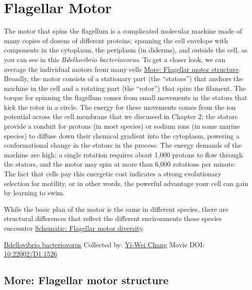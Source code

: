 \documentclass[]{tufte-book}
\begin{document}
\hypertarget{flagellar-motor}{%
\section{Flagellar Motor}\label{flagellar-motor}}

The motor that spins the flagellum is a complicated molecular machine made of many copies of dozens of different proteins, spanning the cell envelope with components in the cytoplasm, the periplasm (in diderms), and outside the cell, as you can see in this \emph{Bdellovibrio bacteriovorus}. To get a closer look, we can average the individual motors from many cells \protect\hyperlink{Flagellar_motor_structure}{More: Flagellar motor structure}. Broadly, the motor consists of a stationary part (the ``stators'') that anchors the machine in the cell and a rotating part (the ``rotor'') that spins the filament. The torque for spinning the flagellum comes from small movements in the stators that kick the rotor in a circle. The energy for these movements comes from the ion potential across the cell membrane that we discussed in Chapter 2; the stators provide a conduit for protons (in most species) or sodium ions (in some marine species) to diffuse down their chemical gradient into the cytoplasm, powering a conformational change in the stators in the process. The energy demands of the machine are high: a single rotation requires about 1,000 protons to flow through the stators, and the motor may spin at more than 6,000 rotations per minute. The fact that cells pay this energetic cost indicates a strong evolutionary selection for motility, or in other words, the powerful advantage your cell can gain by learning to swim.

While the basic plan of the motor is the same in different species, there are structural differences that reflect the different environments those species encounter \protect\hyperlink{Flagellar_motor_diversity}{Schematic: Flagellar motor diversity}.



\hypertarget{htmlwidget-c328341ea1ea4266c447}{}

\label{fig:6-2}\protect\hyperlink{tree}{Bdellovibrio bacteriovorus} Collected by: \protect\hyperlink{yi-wei_chang}{Yi-Wei Chang} Movie DOI: \href{https://doi.org/10.22002/D1.1526}{10.22002/D1.1526}

\hypertarget{Flagellar_motor_structure}{%
\subsection*{More: Flagellar motor structure}\label{Flagellar_motor_structure}}
\end{document}
